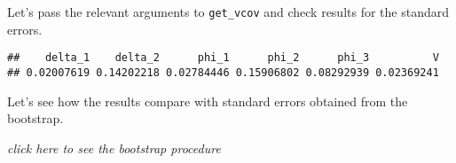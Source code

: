 \documentclass[
]{article}
\newenvironment{Shaded}{\begin{snugshade}}{\end{snugshade}}
\newcommand{\AttributeTok}[1]{\textcolor[rgb]{0.77,0.63,0.00}{#1}}
\newcommand{\FunctionTok}[1]{\textcolor[rgb]{0.00,0.00,0.00}{#1}}
\newcommand{\NormalTok}[1]{#1}
\newcommand{\OtherTok}[1]{\textcolor[rgb]{0.56,0.35,0.01}{#1}}
\newcommand{\SpecialCharTok}[1]{\textcolor[rgb]{0.00,0.00,0.00}{#1}}
\begin{document}
Let's pass the relevant arguments to \texttt{get\_vcov} and check
results for the standard errors.

\begin{Shaded}
\end{Shaded}

\begin{verbatim}
##    delta_1    delta_2      phi_1      phi_2      phi_3          V 
## 0.02007619 0.14202218 0.02784446 0.15906802 0.08292939 0.02369241
\end{verbatim}

Let's see how the results compare with standard errors obtained from the
bootstrap.

\emph{click here to see the bootstrap procedure}
\end{document}

